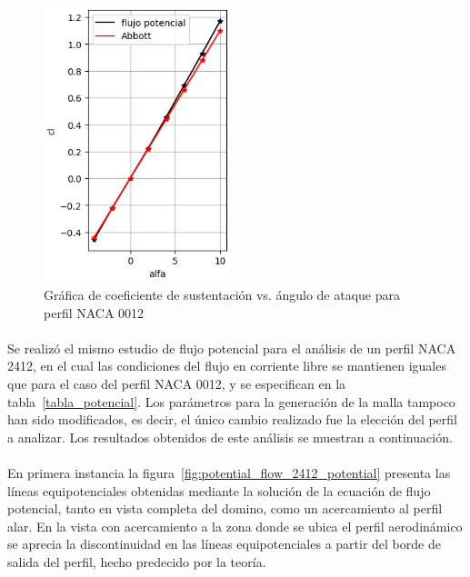 \documentclass[letterpaper, openright, 12pt]{book}
\begin{document}
    \begin{figure}[htbp!]
        \centering
        \includegraphics[keepaspectratio,
            width=0.48\textwidth]{./img/potential_flow_cl}
        \caption{Gráfica de coeficiente de sustentación vs. ángulo de ataque
            para perfil NACA 0012}\label{fig:potential_flow_cl}
    \end{figure}

    \paragraph*{}
    Se realizó el mismo estudio de flujo potencial para el análisis de un
    perfil NACA 2412, en el cual las condiciones del flujo en corriente libre
    se mantienen iguales que para el caso del perfil NACA 0012, y se
    especifican en la tabla~\ref{tabla_potencial}. Los parámetros para la
    generación de la malla tampoco han sido modificados, es decir, el único
    cambio realizado fue la elección del perfil a analizar. Los resultados
    obtenidos de este análisis se muestran a continuación.

    \paragraph*{}
    En primera instancia la figura~\ref{fig:potential_flow_2412_potential}
    presenta las líneas equipotenciales obtenidas mediante la solución de la
    ecuación de flujo potencial, tanto en vista completa del domino, como un
    acercamiento al perfil alar. En la vista con acercamiento a la zona donde se
    ubica el perfil aerodinámico se aprecia la discontinuidad en las líneas
    equipotenciales a partir del borde de salida del perfil, hecho predecido
    por la teoría.
\end{document}
